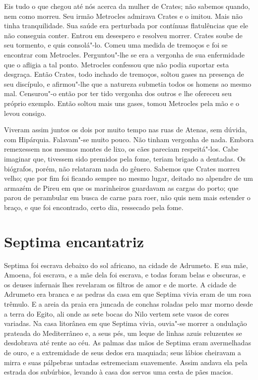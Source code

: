 Eis tudo o que chegou até nós acerca da mulher de Crates; não sabemos
quando, nem como morreu. Seu irmão Metrocles admirava Crates e o imitou.
Mais não tinha tranquilidade. Sua saúde era perturbada por contínuas
flatulências que ele não conseguia conter. Entrou em desespero e resolveu
morrer. Crates soube de seu tormento, e quis consolá"-lo. Comeu uma medida
de tremoços e foi se encontrar com Metrocles. Perguntou"-lhe se era a
vergonha de sua enfermidade que o afligia a tal ponto. Metrocles confessou
que não podia suportar esta desgraça. Então Crates, todo inchado de
tremoços, soltou gases na presença de seu discípulo, e afirmou"-lhe que a
natureza submetia todos os homens ao mesmo mal. Censurou"-o então por ter
tido vergonha dos outros e lhe ofereceu seu próprio exemplo. Então soltou
mais uns gases, tomou Metrocles pela mão e o levou consigo.

Viveram assim juntos os dois por muito tempo nas ruas de Atenas, sem dúvida,
com Hipárquia. Falavam"-se muito pouco. Não tinham vergonha de nada. Embora
remexessem nos mesmos montes de lixo, os cães pareciam respeitá"-los. Cabe
imaginar que, tivessem sido premidos pela fome, teriam brigado a dentadas.
Os biógrafos, porém, não relataram nada do gênero. Sabemos que Crates
morreu velho; que por fim foi ficando sempre no mesmo lugar, deitado no
alpendre de um armazém de Pireu em que os marinheiros guardavam as cargas
do porto; que parou de perambular em busca de carne para roer, não quis
nem mais estender o braço, e que foi encontrado, certo dia, ressecado pela
fome.

\chapter{Septima encantatriz}

Septima foi escrava debaixo do sol africano, na cidade de Adrumeto. E sua
mãe, Amoena, foi escrava, e a mãe dela foi escrava, e todas foram belas e
obscuras, e os deuses infernais lhes revelaram os filtros de amor e de
morte. A cidade de Adrumeto era branca e as pedras da casa em que Septima
vivia eram de um rosa trêmulo. E a areia da praia era juncada de conchas
roladas pelo mar morno desde a terra do Egito, ali onde as sete bocas do
Nilo vertem sete vasos de cores variadas. Na casa litorânea em que Septima
vivia, ouvia"-se morrer a ondulação prateada do Mediterrâneo e, a seus pés,
um leque de linhas azuis reluzentes se desdobrava até rente ao céu. As
palmas das mãos de Septima eram avermelhadas de ouro, e a extremidade de
seus dedos era maquiada; seus lábios cheiravam a mirra e suas pálpebras
untadas estremeciam suavemente. Assim andava ela pela estrada dos
subúrbios, levando à casa dos servos uma cesta de pães macios.

